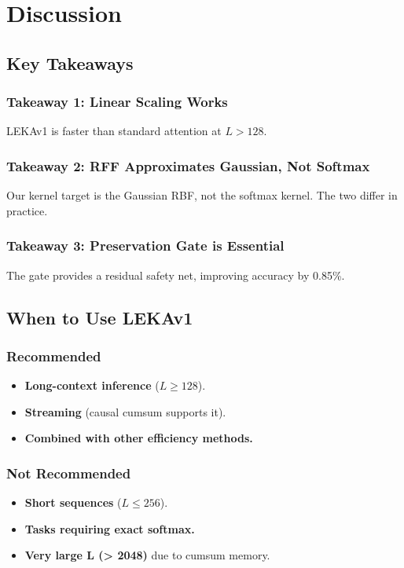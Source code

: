 \section{Discussion}

\subsection{Key Takeaways}

\subsubsection{Takeaway 1: Linear Scaling Works}

LEKAv1 is faster than standard attention at $L > 128$.

\subsubsection{Takeaway 2: RFF Approximates Gaussian, Not Softmax}

Our kernel target is the Gaussian RBF, not the softmax kernel. The two 
differ in practice.

\subsubsection{Takeaway 3: Preservation Gate is Essential}

The gate provides a residual safety net, improving accuracy by 
0.85\%.

\subsection{When to Use LEKAv1}

\subsubsection{Recommended}
\begin{itemize}
\item \textbf{Long-context inference} ($L \geq 128$).
\item \textbf{Streaming} (causal cumsum supports it).
\item \textbf{Combined with other efficiency methods.}

\end{itemize}
\subsubsection{Not Recommended}
\begin{itemize}
\item \textbf{Short sequences} ($L \leq 256$).
\item \textbf{Tasks requiring exact softmax.}
\item \textbf{Very large L (> 2048)} due to cumsum memory.

\end{itemize}
